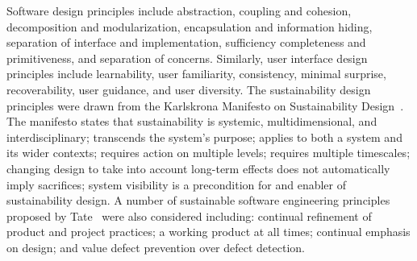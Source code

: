 Software design principles include abstraction, coupling and cohesion,
decomposition and modularization, encapsulation and information hiding,
separation of interface and implementation, sufficiency completeness and
primitiveness, and separation of concerns. Similarly, user interface design
principles include learnability, user familiarity, consistency, minimal
surprise, recoverability, user guidance, and user diversity. The sustainability
design principles were drawn from the Karlskrona Manifesto on Sustainability
Design~\cite{Becker:2014}. The manifesto states that sustainability is systemic,
multidimensional, and interdisciplinary; transcends the system's purpose; applies to
both a system and its wider contexts; requires action on multiple levels;
requires multiple timescales; changing design to take into account long-term
effects does not automatically imply sacrifices; system visibility is a
precondition for and enabler of sustainability design. A number of sustainable
software engineering principles proposed by Tate~\cite{tate:2005} were also
considered including: continual refinement of product and project practices; a
working product at all times; continual emphasis on design; and value defect
prevention over defect detection.

